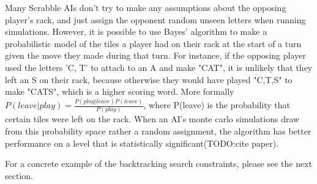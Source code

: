 \documentclass[12pt]{article}
\begin{document}
Many Scrabble AIs don't try to make any assumptions about the opposing
player's rack, and just assign the opponent random unseen letters when
running simulations. However, it is possible to use Bayes' algorithm
to make a probabilistic model of the tiles a player had on their rack
at the start of a turn given the move they made during that turn.%
For instance, if the opposing player used the letters 'C, T' to attach
to an A and make "CAT", it is unlikely that they left an S on their
rack, because otherwise they would have played "C,T,S" to make "CATS",
which is a higher scoring word. More formally $P(leave | play) =
\frac{P(play | leave)P(leave)}{P(play)}$, where P(leave) is the
probability that certain tiles were left on the rack. When an AI's
monte carlo simulations draw from this probability space rather a
random assignment, the algorithm has better performance on a level
that is statistically significant(TODO:cite paper).

	



For a concrete example of the backtracking search constraints, please
see the next section.
\end{document}
